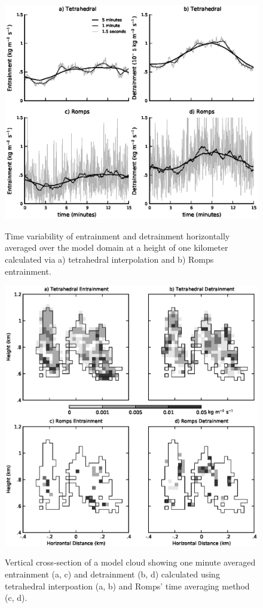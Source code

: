 \documentclass[12pt]{article}
\begin{document}
\begin{figure}[t]
  \noindent\includegraphics[width=39pc,angle=0]{./figures/averaging_convergence}\\ 
  \caption{Time variability of entrainment and detrainment horizontally 
  averaged over the model domain at a height of one kilometer calculated via 
  a) tetrahedral interpolation and b) Romps entrainment.
  }\label{fig:averaging_convergence}
\end{figure}

\begin{figure}[t]
  \noindent\includegraphics[width=39pc,angle=0]{./figures/spatial_variability_1min}\\ 
  \caption{Vertical cross-section of a model cloud showing one minute averaged 
  entrainment (a, c) and detrainment (b, d) calculated using tetrahedral 
  interpoation (a, b) and Romps' time averaging method (c, d).
  }\label{fig:spatial_variability}
\end{figure}
\end{document}
